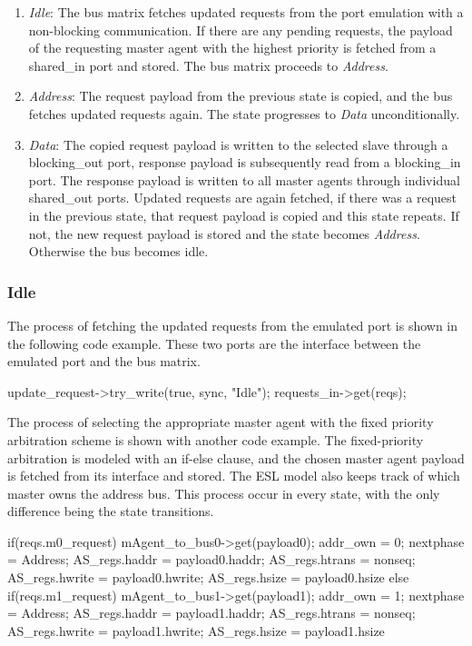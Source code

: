 \begin{enumerate}
 \item \textit{Idle}: The bus matrix fetches updated requests from the port emulation with a non-blocking communication. If there are any pending requests, the payload of the requesting master agent with the highest priority is fetched from a shared\_in port and stored. The bus matrix proceeds to \textit{Address}. 
 \item \textit{Address}: The request payload from the previous state is copied, and the bus fetches updated requests again. The state progresses to \textit{Data} unconditionally.
 \item \textit{Data}: The copied request payload is written to the selected slave through a blocking\_out port, response payload is subsequently read from a blocking\_in port. The response payload is written to all master agents through individual shared\_out ports. Updated requests are again fetched, if there was a request in the previous state, that request payload is copied and this state repeats. If not, the new request payload is stored and the state becomes \textit{Address}. Otherwise the bus becomes idle.    
\end{enumerate}

\subsubsection{Idle}
The process of fetching the updated requests from the emulated port is shown in the following code example. These two ports are the interface between the emulated port and the bus matrix.
\begin{C++}
update_request->try_write(true, sync, "Idle");
requests_in->get(reqs);
\end{C++}
 The process of selecting the appropriate master agent with the fixed priority arbitration scheme is shown with another code example. The fixed-priority arbitration is modeled with an if-else clause, and the chosen master agent payload is fetched from its interface and stored. The ESL model also keeps track of which master owns the address bus. This process occur in every state, with the only difference being the state transitions. 

\begin{C++}
 if(reqs.m0_request){
   mAgent_to_bus0->get(payload0);
   addr_own = 0;
   nextphase = Address;
   AS_regs.haddr = payload0.haddr;
   AS_regs.htrans = nonseq;
   AS_regs.hwrite = payload0.hwrite;
   AS_regs.hsize = payload0.hsize
 }else if(reqs.m1_request){
   mAgent_to_bus1->get(payload1);
   addr_own = 1;
   nextphase = Address;
   AS_regs.haddr = payload1.haddr;
   AS_regs.htrans = nonseq;
   AS_regs.hwrite = payload1.hwrite;
   AS_regs.hsize = payload1.hsize
 }
\end{C++}

